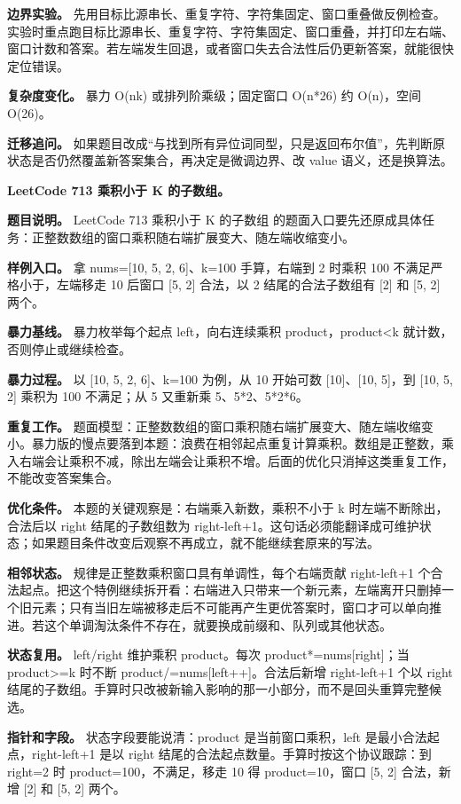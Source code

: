 \textbf{边界实验。} 先用目标比源串长、重复字符、字符集固定、窗口重叠做反例检查。实验时重点跑目标比源串长、重复字符、字符集固定、窗口重叠，并打印左右端、窗口计数和答案。若左端发生回退，或者窗口失去合法性后仍更新答案，就能很快定位错误。

\textbf{复杂度变化。} 暴力 O(nk) 或排列阶乘级；固定窗口 O(n*26) 约 O(n)，空间 O(26)。

\textbf{迁移追问。} 如果题目改成“与找到所有异位词同型，只是返回布尔值”，先判断原状态是否仍然覆盖新答案集合，再决定是微调边界、改 value 语义，还是换算法。

\noindent\textbf{LeetCode 713 乘积小于 K 的子数组。}

\textbf{题目说明。} LeetCode 713 乘积小于 K 的子数组 的题面入口要先还原成具体任务：正整数数组的窗口乘积随右端扩展变大、随左端收缩变小。

\textbf{样例入口。} 拿 nums=[10, 5, 2, 6]、k=100 手算，右端到 2 时乘积 100 不满足严格小于，左端移走 10 后窗口 [5, 2] 合法，以 2 结尾的合法子数组有 [2] 和 [5, 2] 两个。

\textbf{暴力基线。} 暴力枚举每个起点 left，向右连续乘积 product，product<k 就计数，否则停止或继续检查。

\textbf{暴力过程。} 以 [10, 5, 2, 6]、k=100 为例，从 10 开始可数 [10]、[10, 5]，到 [10, 5, 2] 乘积为 100 不满足；从 5 又重新乘 5、5*2、5*2*6。

\textbf{重复工作。} 题面模型：正整数数组的窗口乘积随右端扩展变大、随左端收缩变小。暴力版的慢点要落到本题：浪费在相邻起点重复计算乘积。数组是正整数，乘入右端会让乘积不减，除出左端会让乘积不增。后面的优化只消掉这类重复工作，不能改变答案集合。

\textbf{优化条件。} 本题的关键观察是：右端乘入新数，乘积不小于 k 时左端不断除出，合法后以 right 结尾的子数组数为 right-left+1。这句话必须能翻译成可维护状态；如果题目条件改变后观察不再成立，就不能继续套原来的写法。

\textbf{相邻状态。} 规律是正整数乘积窗口具有单调性，每个右端贡献 right-left+1 个合法起点。把这个特例继续拆开看：右端进入只带来一个新元素，左端离开只删掉一个旧元素；只有当旧左端被移走后不可能再产生更优答案时，窗口才可以单向推进。若这个单调淘汰条件不存在，就要换成前缀和、队列或其他状态。

\textbf{状态复用。} left/right 维护乘积 product。每次 product*=nums[right]；当 product>=k 时不断 product/=nums[left++]。合法后新增 right-left+1 个以 right 结尾的子数组。手算时只改被新输入影响的那一小部分，而不是回头重算完整候选。

\textbf{指针和字段。} 状态字段要能说清：product 是当前窗口乘积，left 是最小合法起点，right-left+1 是以 right 结尾的合法起点数量。手算时按这个协议跟踪：到 right=2 时 product=100，不满足，移走 10 得 product=10，窗口 [5, 2] 合法，新增 [2] 和 [5, 2] 两个。

